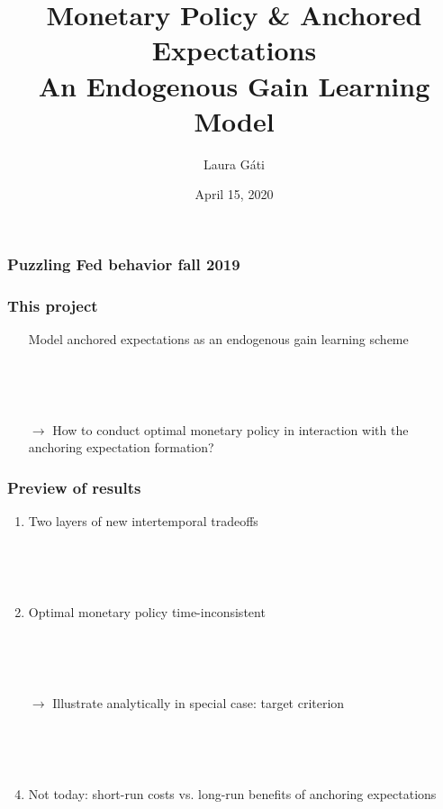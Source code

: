 \documentclass[11pt]{beamer}
\author[]{Laura G\'ati}
\institute[]{Boston College}
\title[]{Monetary Policy \& Anchored Expectations \\
An Endogenous Gain Learning Model}
\date[]{April 15, 2020}
\def \myFigPath {../../figures/}
\begin{document}
\begin{frame}

\maketitle


\end{frame}



\begin{frame}
	\frametitle{Puzzling Fed behavior fall 2019}

\begin{figure}[h!]
\hfil {}
\end{figure}


\end{frame}



\begin{frame}
	\frametitle{This project}
	
	\begin{enumerate}
	\item[] Model anchored expectations as an endogenous gain learning scheme
	
	\
	
	\
	
	\item[$\rightarrow$] How to conduct optimal monetary policy in interaction with the anchoring expectation formation?
	\end{enumerate}
	\end{frame}
\begin{frame}
	\frametitle{Preview of results}
	
	\begin{enumerate}
	\item Two layers of new intertemporal tradeoffs 

	
	\
	
	\
	
	\item Optimal monetary policy time-inconsistent
	
	\
	
	\
	
	
	\item[$\rightarrow$] Illustrate analytically in special case: target criterion 
	
	\
	
	\
	\item Not today: short-run costs vs. long-run benefits of anchoring expectations

	\end{enumerate}


\end{frame}
\end{document}
